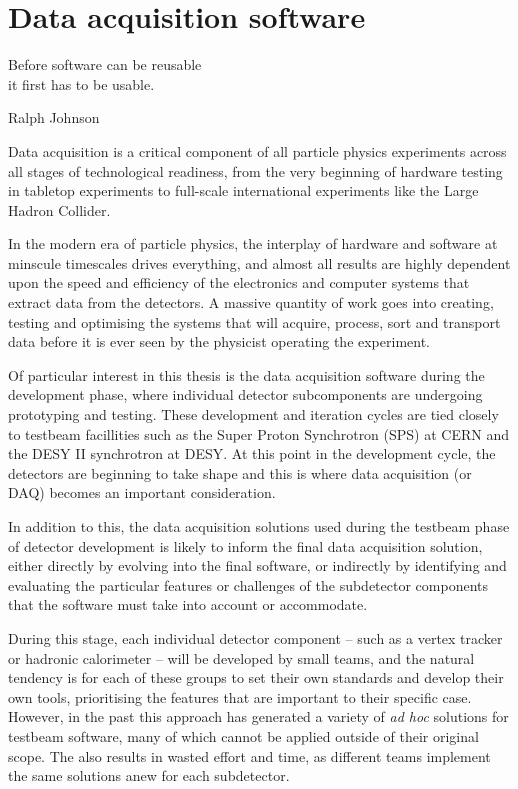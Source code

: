 \chapter{Data acquisition software}

\epigraph{Before software can be reusable \\it first has to be usable.}{Ralph Johnson}

Data acquisition is a critical component of all particle physics experiments across all stages of technological readiness, from the very beginning of hardware testing in tabletop experiments to full-scale international experiments like the Large Hadron Collider. 

In the modern era of particle physics, the interplay of hardware and software at minscule timescales drives everything, and almost all results are highly dependent upon the speed and efficiency of the electronics and computer systems that extract data from the detectors. A massive quantity of work goes into creating, testing and optimising the systems that will acquire, process, sort and transport data before it is ever seen by the physicist operating the experiment.

Of particular interest in this thesis is the data acquisition software during the development phase, where individual detector subcomponents are undergoing prototyping and testing. These development and iteration cycles are tied closely to testbeam facillities such as the Super Proton Synchrotron (SPS) at CERN and the DESY II synchrotron at DESY. At this point in the development cycle, the detectors are beginning to take shape and this is where data acquisition (or DAQ) becomes an important consideration. 

In addition to this, the data acquisition solutions used during the testbeam phase of detector development is likely to inform the final data acquisition solution, either directly by evolving into the final software, or indirectly by identifying and evaluating the particular features or challenges of the subdetector components that the software must take into account or accommodate.

During this stage, each individual detector component -- such as a vertex tracker or hadronic calorimeter -- will be developed by small teams, and the natural tendency is for each of these groups to set their own standards and develop their own tools, prioritising the features that are important to their specific case. However, in the past this approach has generated a variety of \textit{ad hoc} solutions for testbeam software, many of which cannot be applied outside of their original scope. The also results in wasted effort and time, as different teams implement the same solutions anew for each subdetector.


